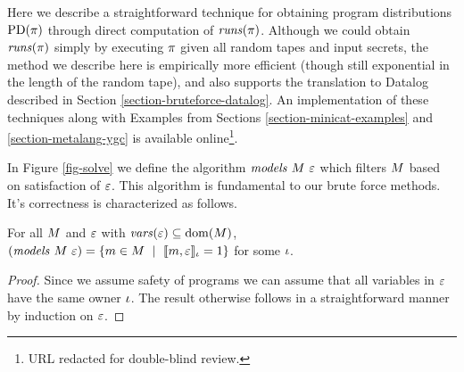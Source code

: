 Here we describe a straightforward technique for obtaining program
distributions $\mathrm{PD}(\pi)$ through direct computation of
$\mathit{runs}(\pi)$. Although we could obtain $\mathit{runs}(\pi)$ simply by
executing $\pi$ given all random tapes and input secrets, the method
we describe here is empirically more efficient (though still
exponential in the length of the random tape), and also supports the
translation to Datalog described in Section
\ref{section-bruteforce-datalog}. An implementation of these
techniques along with Examples from Sections
\ref{section-minicat-examples} and \ref{section-metalang-ygc} is
available online\footnote{URL redacted for double-blind review.}.

In Figure \ref{fig-solve} we define the algorithm $\mathit{models}\ M\ \varepsilon$
which filters $M$ based on satisfaction of $\varepsilon$. This algorithm
is fundamental to our brute force methods. It's correctness is characterized
as follows. 
\begin{lemma}
  \label{lemma-solves}
  For all $M$ and $\varepsilon$ with $\mathit{vars}(\varepsilon) \subseteq \mathrm{dom}(M)$,
  $(\solve{\stores}{\be}) = \{ \store \in \stores \ \mid\ \lcod{\store,\be}{\cid} = 1 \}$
  for some $\iota$.
\end{lemma}
\begin{proof}
  Since we assume safety of programs we can assume that all variables in $\varepsilon$ have the
  same owner $\iota$. The result otherwise follows in a straightforward manner by induction
  on $\varepsilon$. 
\end{proof}

